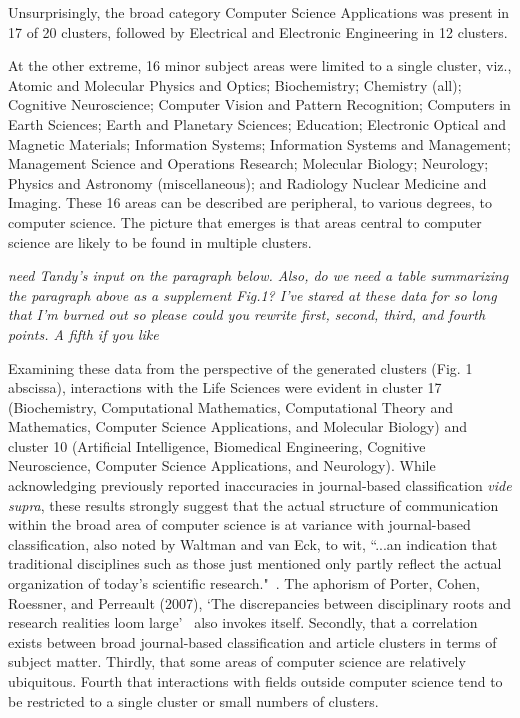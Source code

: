 Unsurprisingly, the broad category Computer Science Applications was present in 17 of 20 clusters, followed by  Electrical and Electronic Engineering in 12 clusters. 

At the other extreme, 16 minor subject areas were limited to a single cluster, viz.,
Atomic and Molecular Physics and Optics; 
Biochemistry; 
Chemistry (all); 
Cognitive Neuroscience; 
Computer Vision and Pattern Recognition;
Computers in Earth Sciences;
Earth and Planetary Sciences; 
Education; 
Electronic Optical and Magnetic Materials; 
Information Systems; 
Information Systems and Management;  
Management Science and Operations Research;
Molecular Biology;
Neurology; 
Physics and Astronomy (miscellaneous); 
and Radiology Nuclear Medicine and Imaging. These 16 areas can be described are peripheral, to various degrees, to computer science. The picture that emerges is that areas central to computer science are likely to be found in multiple clusters. 

\color{blue} \emph{need Tandy's input on the paragraph below. Also, do we need a table summarizing the paragraph above as a supplement Fig.1? I've stared at these data for so long that I'm burned out so please could you rewrite first, second, third, and fourth points. A fifth if you like} \color{black}

Examining these data from the perspective of the generated clusters (Fig. 1 abscissa), interactions with the Life Sciences were evident in cluster 17 (Biochemistry, Computational Mathematics, Computational Theory and Mathematics, Computer Science Applications, and Molecular Biology) and cluster 10 (Artificial Intelligence, Biomedical Engineering, Cognitive Neuroscience, Computer Science Applications, and Neurology). While acknowledging previously reported inaccuracies in journal-based classification \emph{vide supra}, these results strongly suggest that the actual structure of communication within the broad area of computer science is at variance with journal-based classification, also noted by Waltman and van Eck, to wit, ``...an indication that traditional disciplines such as those just mentioned only partly reflect the actual organization of today's scientific research."~\cite{waltman_new_2012}. The aphorism of Porter, Cohen, Roessner, and Perreault (2007), `The discrepancies between disciplinary roots and research realities loom large'~\cite{porter_measuring_2007} also invokes itself. Secondly, that a correlation exists between broad journal-based classification and article clusters in terms of subject matter. Thirdly, that some areas of computer science are relatively ubiquitous. Fourth that interactions with fields outside computer science tend to be restricted to a single cluster or small numbers of clusters. 

